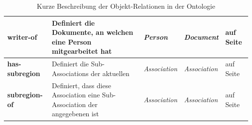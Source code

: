 \documentclass[
    11pt,
    latin1,
    a4paper,
    oneside
]{scrreprt}
\begin{document}
\begin{table}[H]
\begin{tabular}{ | l | p{4cm} | p{3cm} | p{2cm} | p{2cm} | }
    \textbf{writer-of} & Definiert die Dokumente, an welchen eine Person mitgearbeitet hat & \emph{Person} & \emph{Document} & \nameref{sec:rel_writerof} auf Seite \pageref{sec:rel_writerof} \\ \hline
    \textbf{has-subregion} & Definiert die Sub-Associations der aktuellen & \emph{Association} & \emph{Association} & \nameref{sec:rel_hassubregion} auf Seite \pageref{sec:rel_hassubregion} \\ \hline
    \textbf{subregion-of} & Definiert, dass diese Association eine Sub-Association der angegebenen ist & \emph{Association} & \emph{Association} & \nameref{sec:rel_subregionof} auf Seite \pageref{sec:rel_subregionof} \\ \hline
  \end{tabular}
  \caption{Kurze Beschreibung der Objekt-Relationen in der Ontologie}
  \label{tbl:relations}
\end{table}
\end{document}
